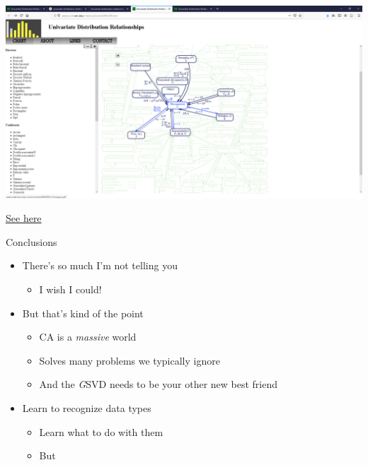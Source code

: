 \documentclass[
  ignorenonframetext,
]{beamer}
\providecommand{\tightlist}{%
  \setlength{\itemsep}{0pt}\setlength{\parskip}{0pt}}
\begin{document}
\begin{frame}

\includegraphics{../images/Chi2.PNG}

\href{http://www.math.wm.edu/~leemis/chart/UDR/UDR.html}{See here}

\end{frame}

\begin{frame}{Conclusions}
\protect\hypertarget{conclusions}{}

\begin{itemize}[<+->]
\tightlist
\item
  There's so much I'm not telling you

  \begin{itemize}[<+->]
  \tightlist
  \item
    I wish I could!
  \end{itemize}
\item
  But that's kind of the point

  \begin{itemize}[<+->]
  \tightlist
  \item
    CA is a \emph{massive} world
  \item
    Solves many problems we typically ignore
  \item
    And the \emph{G}SVD needs to be your other new best friend
  \end{itemize}
\item
  Learn to recognize data types

  \begin{itemize}[<+->]
  \tightlist
  \item
    Learn what to do with them
  \item
    But
  \end{itemize}
\end{itemize}

\end{frame}
\end{document}

